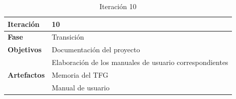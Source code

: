 \begin{table}[htb]
    \centering
    \caption{Iteración 10}
    \label{tab:resultados.planificacion.iter.10}
    \begin{tabular}[t]{| l || p{8cm} |}
        \hline
        \textbf{Iteración} & 10 \\ \hline
        \textbf{Fase} & Transición \\ \hline
        \multirow{1}{*}{\textbf{Objetivos}}
        & Documentación del proyecto \\ \cline{2-2}
        & Elaboración de los manuales de usuario correspondientes \\ \hline
        \multirow{1}{*}{\textbf{Artefactos}}
        & Memoria del TFG \\ \cline{2-2}
        & Manual de usuario \\ \hline
        \hline
    \end{tabular}
\end{table}